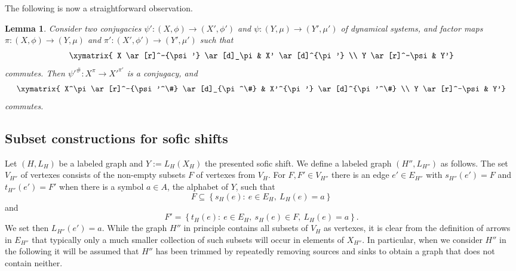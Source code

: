 \documentclass[12pt,oneside,english]{amsart}
\newtheorem{lemma}[thm]{Lemma}
\begin{document}
The following is now a straightforward observation.
\begin{lemma}\label{25-06-25ax}
Consider two conjugacies $\psi' : (X,\phi) \to (X',\phi')$ and $\psi : (Y,\mu) \to (Y',\mu')$ of dynamical systems, and factor maps $\pi : (X,\phi) \to (Y,\mu)$ and $\pi' : (X',\phi') \to (Y',\mu')$ such that
\begin{equation*}\label{23-06-25x}
\xymatrix{
 X \ar[r]^-{\psi'} \ar[d]_\pi &  X' \ar[d]^{\pi'} \\
Y  \ar[r]^-\psi & Y'}
\end{equation*}
commutes. Then
$\psi'^\# : X^\pi \to {X'}^{\pi'}$
is a conjugacy, and %
\begin{equation*}\label{25-06-25bx}
\xymatrix{
 X^\pi \ar[r]^-{\psi'^\#} \ar[d]_{\pi^\#} &  X'^{\pi'} \ar[d]^{\pi'^\#} \\
Y  \ar[r]^-\psi & Y'}
\end{equation*}
commutes.
\end{lemma}





\subsection{Subset constructions for sofic shifts}\label{subset}

Let $(H,L_H)$ be a labeled graph and $Y:= L_H(X_H)$ the presented sofic shift. We define a labeled graph $(H'', L_{H''})$ as follows. The set $V_{H''}$ of vertexes consists of the non-empty subsets $F$ of vertexes from $V_H$. For $F,F' \in  V_{H''}$ there is an edge $e' \in E_{H''}$ with $s_{H''} (e') = F$ and $t_{H''} (e') = F'$ when there is a symbol $a \in A$, the alphabet of $Y$, such that
\begin{equation*}\label{23-06-25ay}
F \subseteq \left\{ s_H(e): \ e \in E_H, \ L_H(e) = a \right\} 
\end{equation*}
and
$$
F' = \left\{ t_H(e) : \ e \in E_H, \ s_H(e) \in F, \ L_H(e) = a \right\} .
$$ 
We set then $L_{H''} (e') = a$. While the graph $H''$ in principle contains all subsets of $V_H$ as vertexes, it is clear from the definition of arrows in $E_{H''}$ that typically only a much smaller collection of such subsets will occur in elements of $X_{H''}$. In particular, when we consider $H''$ in the following it will be assumed that $H''$ has been trimmed by repeatedly removing sources and sinks to obtain a graph that does not contain neither.
\end{document}
